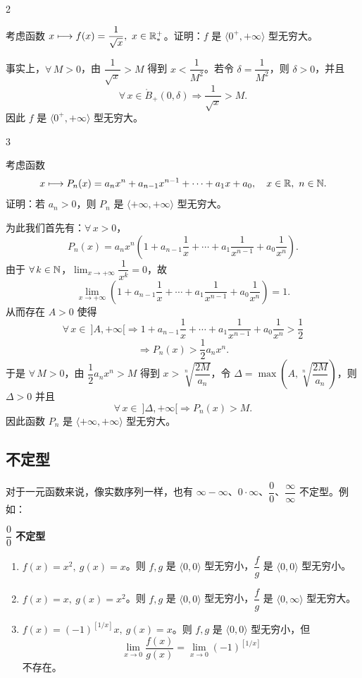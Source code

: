 \begin{sourceexample}{2}

	考虑函数 \(x\longmapsto f(x)=\dfrac1{\sqrt{x}},\ x\in\R^+_*\)。证明：\(f\) 是 \(\langle0^+,+\infty\rangle\) 型无穷大。

	事实上，\(\forall\,M>0\)，由 \(\dfrac1{\sqrt{x}}>M\) 得到 \(x<\dfrac1{M^2}\)。若令 \(\delta=\dfrac1{M^2}\)，则 \(\delta>0\)，并且
	\[
	\forall\,x\in\mathring{B}_+(0,\delta)\Longrightarrow \frac1{\sqrt{x}}>M.
	\]
	因此 \(f\) 是 \(\langle0^+,+\infty\rangle\) 型无穷大。

\end{sourceexample}

\begin{sourceexample}{3}

	考虑函数
	\[
	x\longmapsto P_n(x)=a_nx^n+a_{n-1}x^{n-1}+\cdots+a_1x+a_0,\quad x\in\R,\ n\in\N.
	\]
	证明：若 \(a_n>0\)，则 \(P_n\) 是 \(\langle+\infty,+\infty\rangle\) 型无穷大。

	为此我们首先有：\(\forall\,x>0\)，
	\[
	P_n(x)=a_nx^n\left(1+a_{n-1}\frac1x+\cdots+a_1\frac1{x^{n-1}}+a_0\frac1{x^n}\right).
	\]
	由于 \(\forall\,k\in\mathbb{N}\)，\(\lim_{x\to+\infty}\dfrac1{x^k}=0\)，故
	\[
	\lim_{x\to+\infty}\left(1+a_{n-1}\frac1x+\cdots+a_1\frac1{x^{n-1}}+a_0\frac1{x^n}\right)=1.
	\]
	从而存在 \(A>0\) 使得
	\[
	\forall\,x\in\ ]A,+\infty[\Longrightarrow 1+a_{n-1}\frac1x+\cdots+a_1\frac1{x^{n-1}}+a_0\frac1{x^n}>\frac12
	\]
	\[
	\Longrightarrow P_n(x)>\frac12a_nx^n.
	\]
	于是 \(\forall\,M>0\)，由 \(\dfrac12a_nx^n>M\) 得到 \(x>\sqrt[n]{\dfrac{2M}{a_n}}\)，令 \(\Delta=\max\left(A,\sqrt[n]{\dfrac{2M}{a_n}}\right)\)，则 \(\Delta>0\) 并且
	\[
	\forall\,x\in\ ]\Delta,+\infty[\Longrightarrow P_n(x)>M.
	\]
	因此函数 \(P_n\) 是 \(\langle+\infty,+\infty\rangle\) 型无穷大。

\end{sourceexample}

\subsection{不定型}
	\label{sec:4-3-2}

对于一元函数来说，像实数序列一样，也有 \(\infty-\infty\)、\(0\cdot\infty\)、\(\dfrac00\)、\(\dfrac\infty\infty\) 不定型。例如：

\textbf{\(\dfrac00\) 不定型}\quad
\begin{enumerate}[label=\arabic*)]
	\item \(f(x)=x^2,\ g(x)=x\)。则 \(f,g\) 是 \(\langle0,0\rangle\) 型无穷小，\(\dfrac fg\) 是 \(\langle0,0\rangle\) 型无穷小。
	\item \(f(x)=x,\ g(x)=x^2\)。则 \(f,g\) 是 \(\langle0,0\rangle\) 型无穷小，\(\dfrac fg\) 是 \(\langle0,\infty\rangle\) 型无穷大。
	\item \(f(x)=(-1)^{[1/x]}x,\ g(x)=x\)。则 \(f,g\) 是 \(\langle0,0\rangle\) 型无穷小，但
	\[
	\lim_{x\to0}\frac{f(x)}{g(x)}=\lim_{x\to0}(-1)^{[1/x]}
	\]
	不存在。
\end{enumerate}

